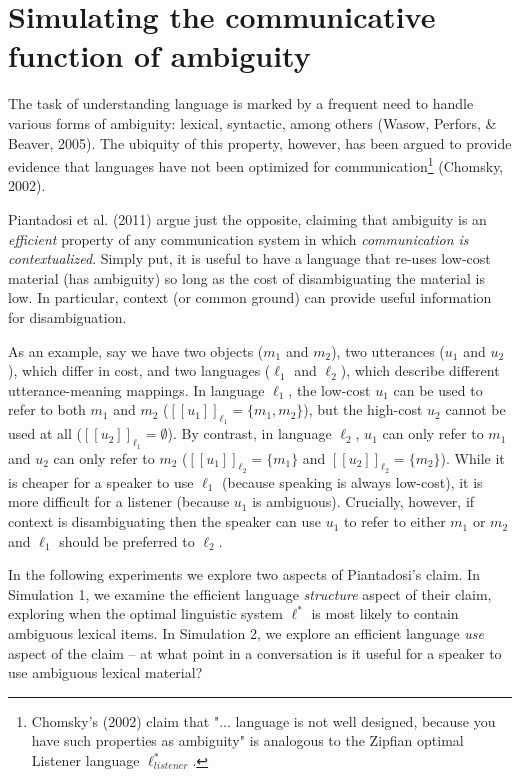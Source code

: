 \documentclass[10pt, letterpaper]{article}
\begin{document}
\section{Simulating the communicative function of
ambiguity}\label{simulating-the-communicative-function-of-ambiguity}

The task of understanding language is marked by a frequent need to
handle various forms of ambiguity: lexical, syntactic, among others
(Wasow, Perfors, \& Beaver, 2005). The ubiquity of this property,
however, has been argued to provide evidence that languages have not
been optimized for
communication\footnote{Chomsky's (2002) claim that "... language is not well designed, because you have such properties as ambiguity" is analogous to the Zipfian optimal Listener language $\ell_{listener}^*$.}
(Chomsky, 2002).

Piantadosi et al. (2011) argue just the opposite, claiming that
ambiguity is an \emph{efficient} property of any communication system in
which \emph{communication is contextualized}. Simply put, it is useful
to have a language that re-uses low-cost material (has ambiguity) so
long as the cost of disambiguating the material is low. In particular,
context (or common ground) can provide useful information for
disambiguation.\par

As an example, say we have two objects (\(m_1\) and \(m_2\)), two
utterances (\(u_1\) and \(u_2\)), which differ in cost, and two
languages (\(\ell_1\) and \(\ell_2\)), which describe different
utterance-meaning mappings. In language \(\ell_1\), the low-cost \(u_1\)
can be used to refer to both \(m_1\) and \(m_2\)
(\([[u_1]]_{\ell_1} = \{m_1, m_2 \}\)), but the high-cost \(u_2\) cannot
be used at all (\([[u_2]]_{\ell_1} = \emptyset\)). By contrast, in
language \(\ell_2\), \(u_1\) can only refer to \(m_1\) and \(u_2\) can
only refer to \(m_2\) (\([[u_1]]_{\ell_2} = \{m_1\}\) and
\([[u_2]]_{\ell_2} = \{m_2 \}\)). While it is cheaper for a speaker to
use \(\ell_1\) (because speaking is always low-cost), it is more
difficult for a listener (because \(u_1\) is ambiguous). Crucially,
however, if context is disambiguating then the speaker can use \(u_1\)
to refer to either \(m_1\) or \(m_2\) and \(\ell_1\) should be preferred
to \(\ell_2\).\par

In the following experiments we explore two aspects of Piantadosi's
claim. In Simulation 1, we examine the efficient language
\emph{structure} aspect of their claim, exploring when the optimal
linguistic system \(\ell^*\) is most likely to contain ambiguous lexical
items. In Simulation 2, we explore an efficient language \emph{use}
aspect of the claim -- at what point in a conversation is it useful for
a speaker to use ambiguous lexical material?\par
\end{document}
